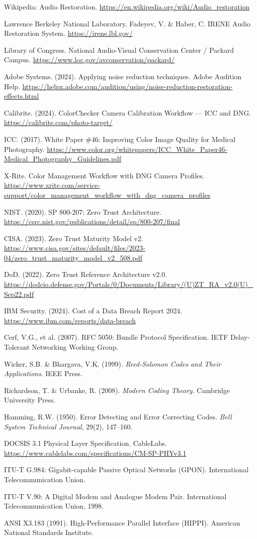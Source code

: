 \documentclass[11pt,letterpaper]{article}
\begin{document}
\begin{enumerate}[leftmargin=*, label={[\arabic*]}, itemsep=2pt]
\item Wikipedia: Audio Restoration. \url{https://en.wikipedia.org/wiki/Audio_restoration}
\item Lawrence Berkeley National Laboratory. Fadeyev, V. \& Haber, C. IRENE Audio Restoration System. \url{https://irene.lbl.gov/}
\item Library of Congress. National Audio-Visual Conservation Center / Packard Campus. \url{https://www.loc.gov/avconservation/packard/}
\item Adobe Systems. (2024). Applying noise reduction techniques. Adobe Audition Help. \url{https://helpx.adobe.com/audition/using/noise-reduction-restoration-effects.html}
\item Calibrite. (2024). ColorChecker Camera Calibration Workflow --- ICC and DNG. \url{https://calibrite.com/photo-target/}
\item ICC. (2017). White Paper \#46: Improving Color Image Quality for Medical Photography. \url{https://www.color.org/whitepapers/ICC_White_Paper46-Medical_Photography_Guidelines.pdf}
\item X-Rite. Color Management Workflow with DNG Camera Profiles. \url{https://www.xrite.com/service-support/color_management_workflow_with_dng_camera_profiles}
\item NIST. (2020). SP 800-207: Zero Trust Architecture. \url{https://csrc.nist.gov/publications/detail/sp/800-207/final}
\item CISA. (2023). Zero Trust Maturity Model v2. \url{https://www.cisa.gov/sites/default/files/2023-04/zero_trust_maturity_model_v2_508.pdf}
\item DoD. (2022). Zero Trust Reference Architecture v2.0. \url{https://dodcio.defense.gov/Portals/0/Documents/Library/(U)ZT_RA_v2.0(U)_Sep22.pdf}
\item IBM Security. (2024). Cost of a Data Breach Report 2024. \url{https://www.ibm.com/reports/data-breach}
\item Cerf, V.G., et al. (2007). RFC 5050: Bundle Protocol Specification. IETF Delay-Tolerant Networking Working Group.
\item Wicker, S.B. \& Bhargava, V.K. (1999). \emph{Reed-Solomon Codes and Their Applications}. IEEE Press.
\item Richardson, T. \& Urbanke, R. (2008). \emph{Modern Coding Theory}. Cambridge University Press.
\item Hamming, R.W. (1950). Error Detecting and Error Correcting Codes. \emph{Bell System Technical Journal}, 29(2), 147--160.
\item DOCSIS 3.1 Physical Layer Specification. CableLabs. \url{https://www.cablelabs.com/specifications/CM-SP-PHYv3.1}
\item ITU-T G.984: Gigabit-capable Passive Optical Networks (GPON). International Telecommunication Union.
\item ITU-T V.90: A Digital Modem and Analogue Modem Pair. International Telecommunication Union, 1998.
\item ANSI X3.183 (1991). High-Performance Parallel Interface (HIPPI). American National Standards Institute.
\end{enumerate}
\end{document}
